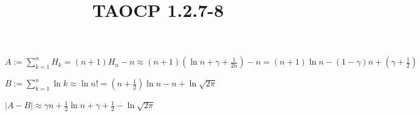 \documentclass{article}
\title{TAOCP 1.2.7\mbox{-}8}
\begin{document}
\maketitle

 \( A:=\sum_{k=1}^{n} H_{k} = (n + 1)H_{n} - n \approx (n + 1)(\ln{n} + \gamma + \frac{1}{2n}) - n = (n + 1)\ln{n} - (1-\gamma) n + (\gamma + \frac{1}{2}) \)

 \( B:=\sum_{k=1}^{n} \ln{k} \approx \ln n! = (n+\frac{1}{2}) \ln{n} - n + \ln{\sqrt{2\pi}} \)

\( |A-B| \approx \gamma n + \frac{1}{2} \ln{n} + \gamma + \frac{1}{2} - \ln{\sqrt{2\pi}} \)
\end{document}
